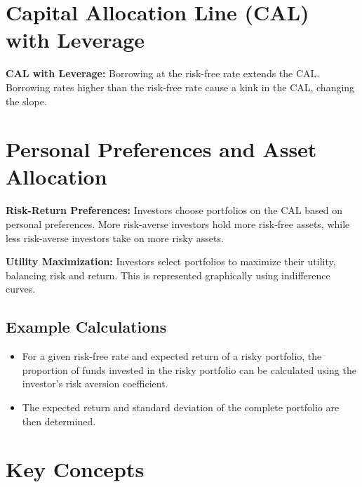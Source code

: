 \documentclass[
]{book}
\providecommand{\tightlist}{%
  \setlength{\itemsep}{0pt}\setlength{\parskip}{0pt}}
\begin{document}
\hypertarget{capital-allocation-line-cal-with-leverage}{%
\section{Capital Allocation Line (CAL) with Leverage}\label{capital-allocation-line-cal-with-leverage}}

\textbf{CAL with Leverage:} Borrowing at the risk-free rate extends the CAL. Borrowing rates higher than the risk-free rate cause a kink in the CAL, changing the slope.

\hypertarget{personal-preferences-and-asset-allocation}{%
\section{Personal Preferences and Asset Allocation}\label{personal-preferences-and-asset-allocation}}

\textbf{Risk-Return Preferences:} Investors choose portfolios on the CAL based on personal preferences. More risk-averse investors hold more risk-free assets, while less risk-averse investors take on more risky assets.

\textbf{Utility Maximization:} Investors select portfolios to maximize their utility, balancing risk and return. This is represented graphically using indifference curves.

\hypertarget{example-calculations}{%
\subsection{Example Calculations}\label{example-calculations}}

\begin{itemize}
\tightlist
\item
  For a given risk-free rate and expected return of a risky portfolio, the proportion of funds invested in the risky portfolio can be calculated using the investor's risk aversion coefficient.
\item
  The expected return and standard deviation of the complete portfolio are then determined.
\end{itemize}

\hypertarget{key-concepts}{%
\section{Key Concepts}\label{key-concepts}}
\end{document}
